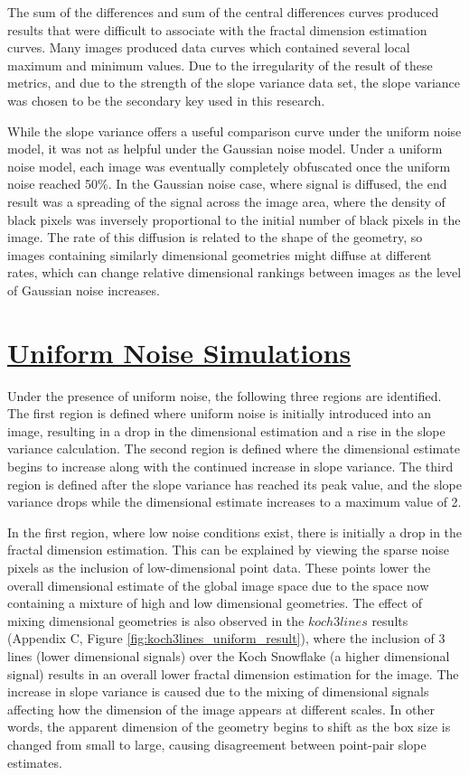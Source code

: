 \documentclass[12pt, oneside]{book}
\begin{document}
The sum of the differences and sum of the central differences curves produced results that were difficult to associate with the fractal dimension estimation curves.  Many images produced data curves which contained several local maximum and minimum values.  Due to the irregularity of the result of these metrics, and due to the strength of the slope variance data set, the slope variance was chosen to be the secondary key used in this research.

While the slope variance offers a useful comparison curve under the uniform noise model, it was not as helpful under the Gaussian noise model.  Under a uniform noise model, each image was eventually completely obfuscated once the uniform noise reached 50\%.  In the Gaussian noise case, where signal is diffused, the end result was a spreading of the signal across the image area, where the density of black pixels was inversely proportional to the initial number of black pixels in the image.  The rate of this diffusion is related to the shape of the geometry, so images containing similarly dimensional geometries might diffuse at different rates, which can change relative dimensional rankings between images as the level of Gaussian noise increases.

\section{\underline{Uniform Noise Simulations}}
Under the presence of uniform noise, the following three regions are identified. The first region is defined where uniform noise is initially introduced into an image, resulting in a drop in the dimensional estimation and a rise in the slope variance calculation.  The second region is defined where the dimensional estimate begins to increase along with the continued increase in slope variance.  The third region is defined after the slope variance has reached its peak value, and the slope variance drops while the dimensional estimate increases to a maximum value of 2.

In the first region, where low noise conditions exist, there is initially a drop in the fractal dimension estimation.  This can be explained by viewing the sparse noise pixels as the inclusion of low-dimensional point data.  These points lower the overall dimensional estimate of the global image space due to the space now containing a mixture of high and low dimensional geometries.  The effect of mixing dimensional geometries is also observed in the \(koch3lines\) results (Appendix C, Figure \ref{fig:koch3lines_uniform_result}), where the inclusion of 3 lines (lower dimensional signals) over the Koch Snowflake (a higher dimensional signal) results in an overall lower fractal dimension estimation for the image.  The increase in slope variance is caused due to the mixing of dimensional signals affecting how the dimension of the image appears at different scales.  In other words, the apparent dimension of the geometry begins to shift as the box size is changed from small to large, causing disagreement between point-pair slope estimates.
\end{document}
